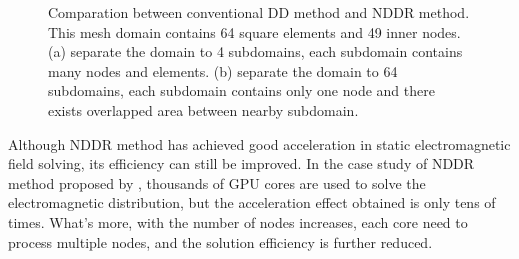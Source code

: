 \documentclass[journal,transmag]{IEEEtran}
\begin{document}
\begin{figure}
	\centering
	\caption{Comparation between conventional DD method and NDDR method. This mesh domain contains 64 square elements and 49 inner nodes. (a) separate the domain to 4 subdomains, each subdomain contains many nodes and elements. (b) separate the domain to 64 subdomains, each subdomain contains only one node and there exists overlapped area between nearby subdomain.}
\end{figure}
Although NDDR method has achieved good acceleration in static electromagnetic field solving, its efficiency can still be improved. In the case study of NDDR method proposed by \cite{IEEEhowto:Liu}, thousands of GPU cores are used to solve the electromagnetic distribution, but the acceleration effect obtained is only tens of times. What's more, with the number of nodes increases, each core need to process multiple nodes, and the solution efficiency is further reduced.
\end{document}
